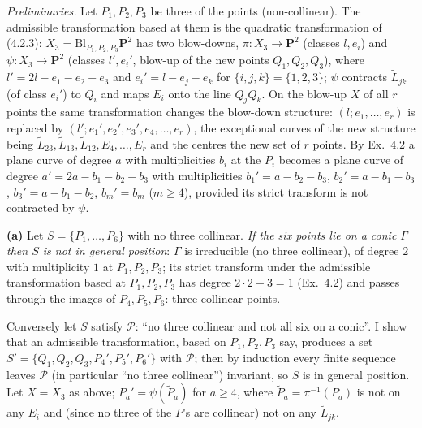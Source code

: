 \documentclass[11pt]{article}
\begin{document}
\emph{Preliminaries.} Let $P_1,P_2,P_3$ be three of the points (non-collinear). The admissible transformation based at them is the quadratic transformation of (4.2.3): $X_3=\mathrm{Bl}_{P_1,P_2,P_3}\mathbf P^2$ has two blow-downs, $\pi:X_3\to\mathbf P^2$ (classes $l,e_i$) and $\psi:X_3\to\mathbf P^2$ (classes $l',e_i'$, blow-up of the new points $Q_1,Q_2,Q_3$), where $l'=2l-e_1-e_2-e_3$ and $e_i'=l-e_j-e_k$ for $\{i,j,k\}=\{1,2,3\}$; $\psi$ contracts $\widetilde L_{jk}$ (of class $e_i'$) to $Q_i$ and maps $E_i$ onto the line $Q_jQ_k$. On the blow-up $X$ of all $r$ points the same transformation changes the blow-down structure: $(l;e_1,\dots,e_r)$ is replaced by $(l';e_1',e_2',e_3',e_4,\dots,e_r)$, the exceptional curves of the new structure being $\widetilde L_{23},\widetilde L_{13},\widetilde L_{12},E_4,\dots,E_r$ and the centres the new set of $r$ points. By Ex.~4.2 a plane curve of degree $a$ with multiplicities $b_i$ at the $P_i$ becomes a plane curve of degree $a'=2a-b_1-b_2-b_3$ with multiplicities $b_1'=a-b_2-b_3$, $b_2'=a-b_1-b_3$, $b_3'=a-b_1-b_2$, $b_m'=b_m$ ($m\ge4$), provided its strict transform is not contracted by $\psi$.

\textbf{(a)} Let $S=\{P_1,\dots,P_6\}$ with no three collinear. \emph{If the six points lie on a conic $\Gamma$ then $S$ is not in general position}: $\Gamma$ is irreducible (no three collinear), of degree $2$ with multiplicity $1$ at $P_1,P_2,P_3$; its strict transform under the admissible transformation based at $P_1,P_2,P_3$ has degree $2\cdot2-3=1$ (Ex.~4.2) and passes through the images of $P_4,P_5,P_6$: three collinear points.

Conversely let $S$ satisfy $\mathcal P$: ``no three collinear and not all six on a conic''. I show that an admissible transformation, based on $P_1,P_2,P_3$ say, produces a set $S'=\{Q_1,Q_2,Q_3,P_4',P_5',P_6'\}$ with $\mathcal P$; then by induction every finite sequence leaves $\mathcal P$ (in particular ``no three collinear'') invariant, so $S$ is in general position. Let $X=X_3$ as above; $P_a'=\psi(\widetilde P_a)$ for $a\ge4$, where $\widetilde P_a=\pi^{-1}(P_a)$ is not on any $E_i$ and (since no three of the $P$'s are collinear) not on any $\widetilde L_{jk}$.
\end{document}
